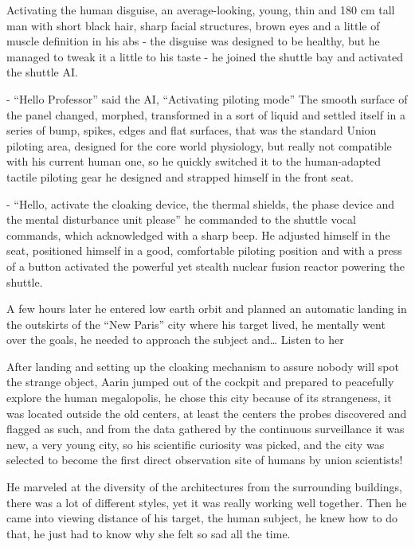 \documentclass[hidelinks,12pt,a4paper]{book}
\begin{document}
Activating the human \gls{disguise}, an average-looking, young, thin and 180 cm tall man with short black hair, 
sharp facial structures, brown eyes and a little of muscle definition in his abs - the disguise was designed to be healthy, but he managed to tweak it a little to his taste -
 he joined the shuttle bay and activated the shuttle AI.\par
 \bigskip

- “Hello Professor” said the AI, “Activating piloting mode”\newline
The smooth surface of the panel changed, morphed, transformed in a sort of liquid and settled itself 
in a series of bump, spikes, edges and flat surfaces, that was the standard Union piloting area, 
designed for the core world physiology, but really not compatible with his current human one, so he 
quickly switched it to the human-adapted tactile piloting gear he designed and strapped himself in the front seat.\par
\bigskip

- “Hello, activate the cloaking device, the thermal shields, the phase device and the mental disturbance unit please” 
he commanded to the shuttle vocal commands, 
which acknowledged with a sharp beep. 
He adjusted himself in the seat, positioned himself in a good, comfortable piloting position and with a press 
of a button activated the powerful yet stealth nuclear fusion reactor powering the shuttle.\par
\bigskip

A few hours later he entered low earth orbit and planned an automatic landing in the outskirts of the 
“New Paris” city where his target lived, he mentally went over the goals, he needed to approach the 
subject and… Listen to her\par
\bigskip

After landing and setting up the cloaking mechanism to assure nobody will spot the strange object, 
Aarin jumped out of the cockpit and prepared to peacefully explore the human megalopolis, 
he chose this city because of its strangeness, it was located outside the old centers, 
at least the centers the probes discovered and flagged as such, and from the data gathered by the continuous 
surveillance it was new, a very young city, so his scientific curiosity was picked, and the city was selected to 
become the first direct observation site of humans by union scientists!\par
\bigskip

He marveled at the diversity of the architectures from the surrounding buildings, 
there was a lot of different styles, yet it was really working well together. Then he came into viewing distance of his target,
 the human subject, he knew how to do that, he just had to know why she felt so sad all the time. \par
 \bigskip
\end{document}
